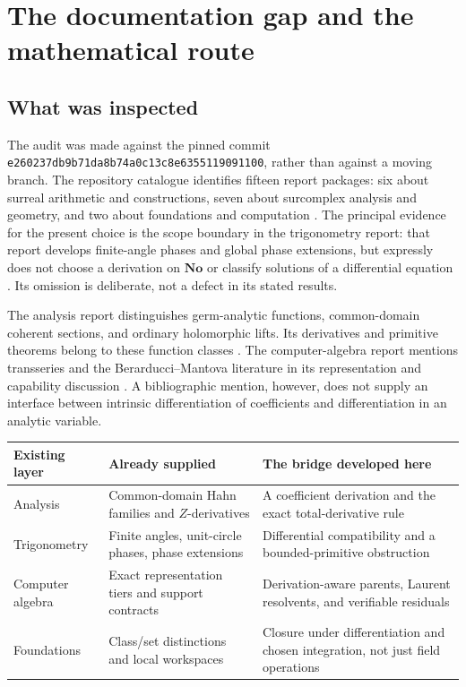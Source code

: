 \documentclass[11pt]{article}
\numberwithin{equation}{section}
\theoremstyle{definition}
\newcommand{\No}{\mathbf{No}}
\newcommand{\snapshot}{\texttt{e260237db9b71da8b74a0c13c8e6355119091100}}
\begin{document}
\section{The documentation gap and the mathematical route}
\label{sec:gap}

\subsection{What was inspected}
The audit was made against the pinned commit \snapshot, rather than against a
moving branch. The repository catalogue identifies fifteen report packages:
six about surreal arithmetic and constructions, seven about surcomplex
analysis and geometry, and two about foundations and computation
\cite{RepoMap,RepoManifest}. The principal evidence for the present choice
is the scope boundary in the trigonometry report: that report develops
finite-angle phases and global phase extensions, but expressly does not
choose a derivation on $\No$ or classify solutions of a differential equation
\cite{RepoTrig}. Its omission is deliberate, not a defect in its stated
results.

The analysis report distinguishes germ-analytic functions, common-domain
coherent sections, and ordinary holomorphic lifts. Its derivatives and
primitive theorems belong to these function classes \cite{RepoAnalysis}.
The computer-algebra report mentions transseries and the
Berarducci--Mantova literature in its representation and capability discussion
\cite{RepoCAS}. A bibliographic mention, however, does not supply an interface
between intrinsic differentiation of coefficients and differentiation in an
analytic variable.

\begin{center}
\begin{tabular}{@{}>{\raggedright\arraybackslash}p{}>{\raggedright\arraybackslash}p{}>{\raggedright\arraybackslash}p{}@{}}
\toprule
Existing layer & Already supplied & The bridge developed here \\
\midrule
Analysis & Common-domain Hahn families and $Z$-derivatives & A coefficient derivation and the exact total-derivative rule \\
Trigonometry & Finite angles, unit-circle phases, phase extensions & Differential compatibility and a bounded-primitive obstruction \\
Computer algebra & Exact representation tiers and support contracts & Derivation-aware parents, Laurent resolvents, and verifiable residuals \\
Foundations & Class/set distinctions and local workspaces & Closure under differentiation and chosen integration, not just field operations \\
\bottomrule
\end{tabular}
\end{center}
\end{document}
